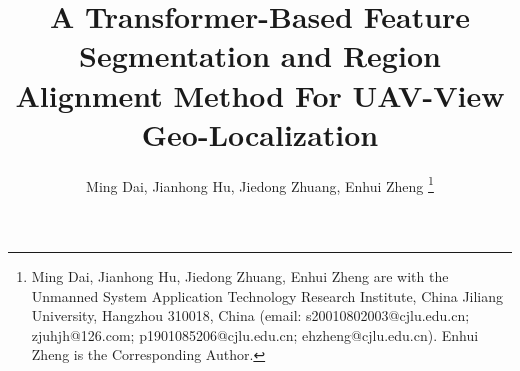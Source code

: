 \documentclass[lettersize,journal]{IEEEtran}
\begin{document}
\title{A Transformer-Based Feature Segmentation and Region Alignment Method For UAV-View Geo-Localization}

\author{
Ming Dai, Jianhong Hu, Jiedong Zhuang, Enhui Zheng
\thanks{Ming Dai, Jianhong Hu, Jiedong Zhuang, Enhui Zheng are with the Unmanned System Application Technology Research Institute, China Jiliang University, Hangzhou 310018, China (email: s20010802003@cjlu.edu.cn; zjuhjh@126.com; p1901085206@cjlu.edu.cn; ehzheng@cjlu.edu.cn). Enhui Zheng is the Corresponding Author.}
}


\maketitle
\end{document}
